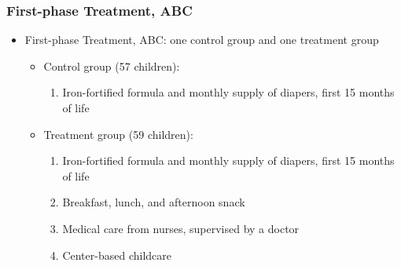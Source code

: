 \documentclass[static]{JJH-Beamer}
\begin{document}

\begin{frame} \label{secondphase}
\frametitle{First-phase Treatment, ABC}
\begin{itemize}
	\item First-phase Treatment, ABC: one control group and one treatment group
		\begin{itemize}
			\item Control group (57 children):
				\begin{enumerate}								
				 \item Iron-fortified formula and monthly supply of diapers, first 15 months of life
				\end{enumerate} 
			\item Treatment group (59 children): 
				\begin{enumerate}
				\item Iron-fortified formula and monthly supply of diapers, first 15 months of life
				\item Breakfast, lunch, and afternoon snack
				\item Medical care from nurses, supervised by a doctor
				\item Center-based childcare
				\end{enumerate}
		\end{itemize}			
\end{itemize}
\hyperlink{programs}{}
\end{frame}

\end{document}
